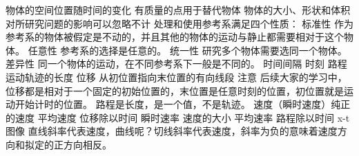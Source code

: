 \markdownRendererDocumentBegin
\markdownRendererSectionBegin
{}\markdownRendererInterblockSeparator
{}\markdownRendererSectionBegin
{}\markdownRendererInterblockSeparator
{}\markdownRendererSectionBegin
{}\markdownRendererInterblockSeparator
{}物体的空间位置随时间的变化\markdownRendererInterblockSeparator
{}
\markdownRendererSectionEnd \markdownRendererSectionBegin
{}\markdownRendererInterblockSeparator
{}有质量的点用于替代物体\markdownRendererParagraphSeparator
{}物体的大小、形状和体积对所研究问题的影响可以忽略不计\markdownRendererInterblockSeparator
{}
\markdownRendererSectionEnd \markdownRendererSectionBegin
{}\markdownRendererInterblockSeparator
{}处理和使用参考系满足四个性质：\markdownRendererParagraphSeparator
{}标准性 作为参考系的物体被假定是不动的，并且其他的物体的运动与静止都需要相对于这个物体。\markdownRendererSoftLineBreak
{}任意性 参考系的选择是任意的。\markdownRendererSoftLineBreak
{}统一性 研究多个物体需要选同一个物体。\markdownRendererSoftLineBreak
{}差异性 同一个物体的运动，在不同参考系下一般是不同的。\markdownRendererInterblockSeparator
{}
\markdownRendererSectionEnd \markdownRendererSectionBegin
{}\markdownRendererInterblockSeparator
{}时间间隔\markdownRendererParagraphSeparator
{}时刻\markdownRendererInterblockSeparator
{}
\markdownRendererSectionEnd \markdownRendererSectionBegin
{}\markdownRendererInterblockSeparator
{}路程 运动轨迹的长度\markdownRendererParagraphSeparator
{}位移 从初位置指向末位置的有向线段\markdownRendererParagraphSeparator
{}注意\markdownRendererSoftLineBreak
{}后续大家的学习中，位移都是相对于一个固定的初始位置的，末位置是任意时刻的位置，初位置就是运动开始计时的位置。\markdownRendererSoftLineBreak
{}路程是长度，是一个值，不是轨迹。\markdownRendererInterblockSeparator
{}
\markdownRendererSectionEnd 
\markdownRendererSectionEnd \markdownRendererSectionBegin
{}\markdownRendererInterblockSeparator
{}速度（瞬时速度）纯正的速度\markdownRendererParagraphSeparator
{}平均速度 位移除以时间\markdownRendererParagraphSeparator
{}瞬时速率 速度的大小\markdownRendererParagraphSeparator
{}平均速率 路程除以时间\markdownRendererParagraphSeparator
{}x-t图像\markdownRendererSoftLineBreak
{}直线斜率代表速度，曲线呢？切线斜率代表速度，斜率为负的意味着速度方向和拟定的正方向相反。\markdownRendererInterblockSeparator
{}\markdownRendererSectionBegin
